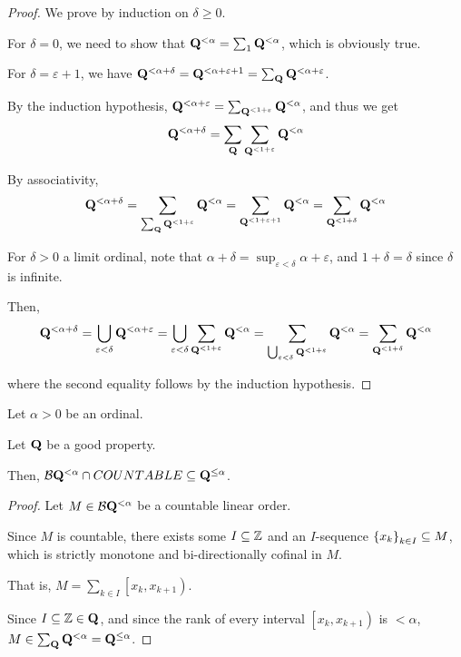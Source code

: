 \begin{proof}
  We prove by induction on $\delta \ge 0$.

  For $\delta = 0$, we need to show that $\mathbf{Q}^{< \alpha} = \sum_{1}\mathbf{Q}^{< \alpha}$,
  which is obviously true.

  For $\delta = \varepsilon + 1$, we have
  $
    \mathbf{Q}^{< \alpha + \delta}
    = \mathbf{Q}^{< \alpha + \varepsilon + 1}
    = \sum_{\mathbf{Q}}{\mathbf{Q}^{< \alpha + \varepsilon}}
  $.

  By the induction hypothesis,
  $
    \mathbf{Q}^{< \alpha + \varepsilon}
    = \sum_{\mathbf{Q}^{< 1 + \varepsilon}}{\mathbf{Q}^{< \alpha}}
  $, and thus we get
  \[
    \mathbf{Q}^{< \alpha + \delta} = \sum_{\mathbf{Q}}{\sum_{\mathbf{Q}^{< 1 + \varepsilon}}{\mathbf{Q}^{< \alpha}}}
  \]

  By associativity,
  \[\mathbf{Q}^{< \alpha + \delta}
    = \sum_{\sum_{\mathbf{Q}}{\mathbf{Q}^{< 1 + \varepsilon}}}{\mathbf{Q}^{< \alpha}}
    = \sum_{\mathbf{Q}^{< 1 + \varepsilon + 1}}{\mathbf{Q}^{< \alpha}}
    = \sum_{\mathbf{Q}^{< 1 + \delta}}{\mathbf{Q}^{< \alpha}}\]

  For $\delta > 0$ a limit ordinal, note that $\alpha + \delta = \sup_{\varepsilon < \delta}{\alpha + \varepsilon}$,
  and $1 + \delta = \delta$ since $\delta$ is infinite.

  Then,
  \[
    \mathbf{Q}^{< \alpha + \delta}
    = \bigcup_{\varepsilon < \delta}{\mathbf{Q}^{< \alpha + \varepsilon}}
    = \bigcup_{\varepsilon < \delta}{\sum_{\mathbf{Q}^{< 1 + \varepsilon}}{\mathbf{Q}^{< \alpha}}}
    = \sum_{\bigcup_{\varepsilon < \delta}{\mathbf{Q}^{< 1 + \varepsilon}}}{\mathbf{Q}^{< \alpha}}
    = \sum_{\mathbf{Q}^{< 1 + \delta}}{\mathbf{Q}^{< \alpha}}
  \]

  where the second equality follows by the induction hypothesis.

\end{proof}



\begin{lemma}
  Let $\alpha > 0$ be an ordinal.

  Let $\mathbf{Q}$ be a good property.
  
  Then, $\mathcal{B}{\mathbf{Q}^{< \alpha}} \cap COUNTABLE \subseteq \mathbf{Q}^{\le \alpha}$.
\end{lemma}

\begin{proof}
  Let $M \in \mathcal{B}{\mathbf{Q}^{< \alpha}}$ be a countable linear order.

  Since $M$ is countable, there exists some $I \subseteq \mathbb{Z}$ and
  an $I$-sequence $\left\{ {x_k} \right\}_{k \in I} \subseteq M$,
  which is strictly monotone and bi-directionally cofinal in $M$.

  That is, $M = \sum_{k \in I} \left[ x_k, x_{k + 1} \right)$.

  Since $I \subseteq \mathbb{Z} \in \mathbf{Q}$, and
  since the rank of every interval $\left[ x_k, x_{k + 1} \right)$ is $< \alpha$,
  $M \in \sum_{\mathbf{Q}}{\mathbf{Q}^{< \alpha}} = \mathbf{Q}^{\le \alpha}$.

\end{proof}